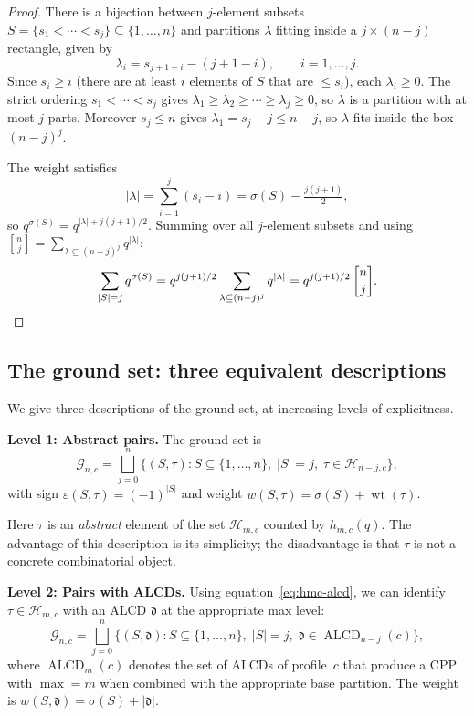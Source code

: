 \documentclass[11pt]{article}
\newcommand{\ALCD}{\operatorname{ALCD}}
\newcommand{\qbin}[2]{\genfrac{[}{]}{0pt}{}{#1}{#2}}
\theoremstyle{plain}
\theoremstyle{definition}
\begin{document}
\begin{proof}
There is a bijection between $j$-element subsets
$S = \{s_1 < \cdots < s_j\} \subseteq \{1,\ldots,n\}$ and partitions
$\lambda$ fitting inside a $j \times (n{-}j)$ rectangle, given by
\[
  \lambda_i = s_{j+1-i} - (j + 1 - i), \qquad i = 1,\ldots, j.
\]
Since $s_i \geq i$ (there are at least $i$ elements of $S$ that are
$\leq s_i$), each $\lambda_i \geq 0$.  The strict ordering
$s_1 < \cdots < s_j$ gives
$\lambda_1 \geq \lambda_2 \geq \cdots \geq \lambda_j \geq 0$,
so $\lambda$ is a partition with at most $j$ parts.  Moreover
$s_j \leq n$ gives $\lambda_1 = s_j - j \leq n - j$, so
$\lambda$ fits inside the box $(n{-}j)^j$.

The weight satisfies
\[
  |\lambda| = \sum_{i=1}^{j}(s_i - i) = \sigma(S) - \tfrac{j(j+1)}{2},
\]
so $q^{\sigma(S)} = q^{|\lambda| + j(j+1)/2}$.  Summing over all
$j$-element subsets and using
$\qbin{n}{j} = \sum_{\lambda \subseteq (n-j)^j} q^{|\lambda|}$:
\[
  \sum_{|S|=j} q^{\sigma(S)}
  = q^{j(j+1)/2} \sum_{\lambda \subseteq (n-j)^j} q^{|\lambda|}
  = q^{j(j+1)/2}\,\qbin{n}{j}. \qedhere
\]
\end{proof}


\subsection{The ground set: three equivalent descriptions}

We give three descriptions of the ground set, at increasing levels
of explicitness.

\medskip
\noindent\textbf{Level 1: Abstract pairs.}
The ground set is
\begin{equation}\label{eq:G-abstract}
  \mathcal{G}_{n,c} =
  \bigsqcup_{j=0}^{n}
  \bigl\{(S, \tau) : S \subseteq \{1,\ldots,n\},\;
    |S| = j,\; \tau \in \mathcal{H}_{n-j,c}\bigr\},
\end{equation}
with sign $\varepsilon(S,\tau) = (-1)^{|S|}$ and weight
$w(S,\tau) = \sigma(S) + \operatorname{wt}(\tau)$.

Here $\tau$ is an \emph{abstract} element of the set
$\mathcal{H}_{m,c}$ counted by $h_{m,c}(q)$.  The advantage of this
description is its simplicity; the disadvantage is that $\tau$ is not a
concrete combinatorial object.

\medskip
\noindent\textbf{Level 2: Pairs with ALCDs.}
Using equation~\eqref{eq:hmc-alcd}, we can identify
$\tau \in \mathcal{H}_{m,c}$ with an ALCD $\mathfrak{d}$ at the
appropriate max level:
\begin{equation}\label{eq:G-alcd}
  \mathcal{G}_{n,c} =
  \bigsqcup_{j=0}^{n}
  \bigl\{(S, \mathfrak{d}) : S \subseteq \{1,\ldots,n\},\;
    |S| = j,\; \mathfrak{d} \in \ALCD_{n-j}(c)\bigr\},
\end{equation}
where $\ALCD_m(c)$ denotes the set of ALCDs of profile~$c$ that produce
a CPP with $\max = m$ when combined with the appropriate base partition.
The weight is $w(S, \mathfrak{d}) = \sigma(S) + |\mathfrak{d}|$.
\end{document}
